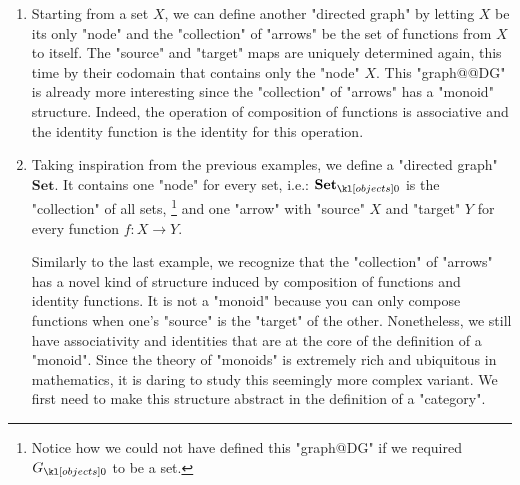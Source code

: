\documentclass[main.tex]{subfiles}
\begin{document}
\begin{exmps}
\begin{enumerate}
		There is a slightly more complex "directed graph" whose "nodes" are the elements of $X$. For each pair $(x,x') \in X \times X$, we can add an "arrow" with "source" $x$ and "target" $x'$. Drawing it is still fairly simple\footnote{Provided the set $X$ is finite}; you draw a "node" for each element of $X$ and an "arrow" from $x$ to $x'$ for each pair $(x,x')$.\footnote{Note that there are so-called ""loops"" which are "arrows" from a "node" to itself because $(x,x)$ is in $X \times X$.}
		\item Starting from a set $X$, we can define another "directed graph" by letting $X$ be its only "node" and the "collection" of "arrows" be the set of functions from $X$ to itself. The "source" and "target" maps are uniquely determined again, this time by their codomain that contains only the "node" $X$. This "graph@@DG" is already more interesting since the "collection" of "arrows" has a "monoid" structure. Indeed, the operation of composition of functions is associative and the identity function is the identity for this operation.
		
		\item Taking inspiration from the previous examples, we define a "directed graph" $\mathbf{Set}$. It contains one "node" for every set, i.e.: $\obj{\mathbf{Set}}$ is the "collection" of all sets, \footnote{Notice how we could not have defined this "graph@DG" if we required $\obj{G}$ to be a set.} and one "arrow" with "source" $X$ and "target" $Y$ for every function $f: X \rightarrow Y$. 
		
		Similarly to the last example, we recognize that the "collection" of "arrows" has a novel kind of structure induced by composition of functions and identity functions. It is not a "monoid" because you can only compose functions when one's "source" is the "target" of the other. Nonetheless, we still have associativity and identities that are at the core of the definition of a "monoid". Since the theory of "monoids" is extremely rich and ubiquitous in mathematics, it is daring to study this seemingly more complex variant. We first need to make this structure abstract in the definition of a "category".
	\end{enumerate}
\end{exmps}
\end{document}
